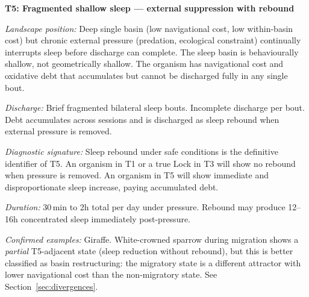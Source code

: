 \documentclass[10pt, a4paper]{article}
\begin{document}
\begin{mdframed}[
  backgroundcolor=topologybox,
  linecolor=headergreen,
  linewidth=0.8pt,
  innertopmargin=0.6em,
  innerbottommargin=0.6em,
  innerleftmargin=0.8em,
  innerrightmargin=0.8em
]
\textbf{T5: Fragmented shallow sleep ---
external suppression with rebound}

\textit{Landscape position:} Deep single
basin (low navigational cost, low
within-basin cost) but chronic external
pressure (predation, ecological constraint)
continually interrupts sleep before
discharge can complete. The sleep basin
is behaviourally shallow, not geometrically
shallow. The organism has navigational
cost and oxidative debt that accumulates
but cannot be discharged fully in any
single bout.

\textit{Discharge:} Brief fragmented
bilateral sleep bouts. Incomplete
discharge per bout. Debt accumulates
across sessions and is discharged as
sleep rebound when external pressure
is removed.

\textit{Diagnostic signature:} Sleep
rebound under safe conditions is the
definitive identifier of T5. An organism
in T1 or a true Lock in T3 will show
no rebound when pressure is removed.
An organism in T5 will show immediate
and disproportionate sleep increase,
paying accumulated debt.

\textit{Duration:} 30\,min to 2h total
per day under pressure. Rebound may
produce 12--16h concentrated sleep
immediately post-pressure.

\textit{Confirmed examples:} Giraffe.
White-crowned sparrow during migration
shows a \textit{partial} T5-adjacent
state (sleep reduction without rebound),
but this is better classified as basin
restructuring: the migratory state is
a different attractor with lower
navigational cost than the non-migratory
state. See Section~\ref{sec:divergences}.
\end{mdframed}

\vspace{0.4em}
\end{document}
